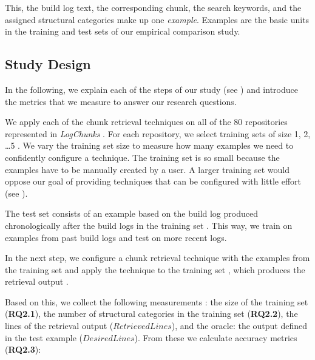 This, the build log text, the corresponding chunk,
the search keywords, and the assigned structural categories
make up one \emph{example}.
Examples are the basic units in the training and test sets of our
empirical comparison study.

\subsection{Study Design}

In the following, we explain each of the steps of our study
(see )
and introduce the metrics that
we measure to answer our research questions.

We apply each of the chunk retrieval techniques
on all of the 80 repositories represented in
\emph{LogChunks} .
For each repository, we select training sets of size 1, 2, \dots 5
.
We vary the training set size to measure how many examples we need to
confidently configure a technique.
The training set is so small because the examples have to be
manually created by a user.
A larger training set would oppose our goal of providing techniques
that can be configured with little effort
(see ).

The test set consists of an example based on the build log produced
chronologically after the build logs in the training set .
This way, we train on examples from past build logs and test on
more recent logs.

In the next step, we configure a chunk retrieval technique with
the examples from the training set  and apply the technique
to the
training set , which produces the retrieval output
.

Based on this, we collect the following measurements :
the size of the training set (\textbf{RQ2.1}),
the number of structural categories in the training
set (\textbf{RQ2.2}),
the lines of the retrieval output ($\mathit{RetrievedLines}$),
and the oracle: the output defined in the test example
($\mathit{DesiredLines}$).
From these we calculate accuracy metrics (\textbf{RQ2.3}):

